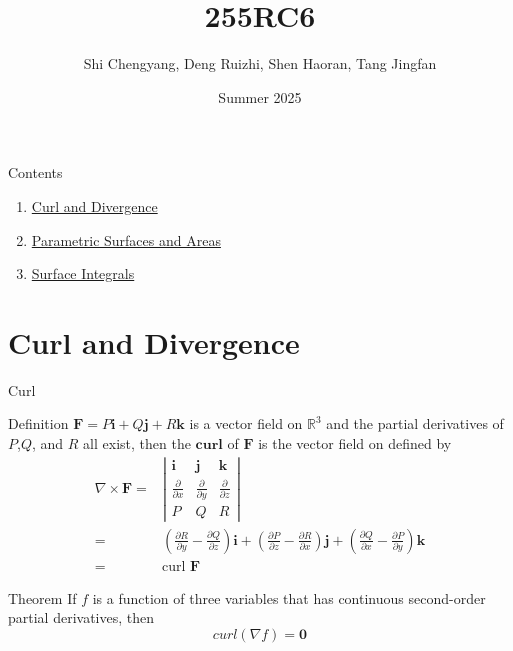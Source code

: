 \documentclass[aspectratio=169]{beamer}
\title{\LARGE 255RC6}
\author{Shi Chengyang, Deng Ruizhi, Shen Haoran, Tang Jingfan}
\date{Summer 2025}
\begin{document}
\maketitle



\begin{frame}{Contents}
    \begin{enumerate}
        \item \hyperlink{1}{Curl and Divergence}
        \item \hyperlink{2}{Parametric Surfaces and Areas}
        \item \hyperlink{3}{Surface Integrals}
    \end{enumerate}
       
\end{frame}

    

\section{Curl and Divergence}
\begin{frame}{Curl}

    \begin{block}{Definition}
$\boldsymbol{F}=P\boldsymbol{i}+Q\boldsymbol{j}+R\boldsymbol{k}$ is a vector field on $\mathbb{R}^3$ and the partial derivatives of $P$,$Q$, and $R$ all exist, then the $\boldsymbol{curl}$ of $\boldsymbol{F}$ is the vector field on defined by
    \begin{align*}
        \nabla\times \boldsymbol{F} = &
        \left|
        \begin{array}{ccc}
            \boldsymbol{i}& \boldsymbol{j}& \boldsymbol{k}\\
            \frac{\partial}{\partial x}& \frac{\partial}{\partial y}&\frac{\partial}{\partial z}\\
            P&Q&R
        \end{array}
        \right| \\
        =& (\frac{\partial R}{\partial y}-\frac{\partial Q}{\partial z})\boldsymbol{i}+(\frac{\partial P}{\partial z}-\frac{\partial R}{\partial x})\boldsymbol{j}+(\frac{\partial Q}{\partial x}-\frac{\partial P}{\partial y})\boldsymbol{k}\\
        =&\text{curl } \boldsymbol{F}
    \end{align*}
    \end{block}

    \begin{block}{Theorem}
        If $f$ is a function of three variables that has continuous second-order partial derivatives, then
        \begin{equation*}
            curl(\nabla f)=\boldsymbol{0}
        \end{equation*}
    \end{block}
\end{frame}
\end{document}
